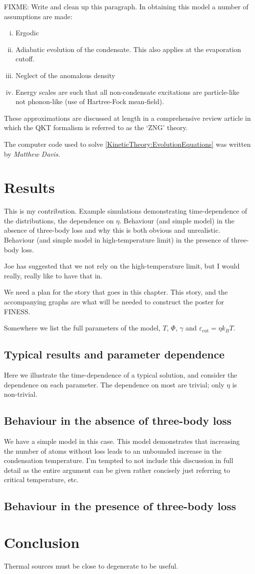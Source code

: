 FIXME: Write and clean up this paragraph. In obtaining this model a number of assumptions are made:
\begin{enumerate}[(i)]
    \item Ergodic
    \item Adiabatic evolution of the condensate. This also applies at the evaporation cutoff.
    \item Neglect of the anomalous density
    \item Energy scales are such that all non-condensate excitations are particle-like not phonon-like (use of Hartree-Fock mean-field).
\end{enumerate}
These approximations are discussed at length in a comprehensive review article \citep{Proukakis:2008} in which the QKT formalism is referred to as the `ZNG' theory.

The computer code used to solve \eqref{KineticTheory:EvolutionEquations} was written by \emph{Matthew Davis}.

\section{Results}
\label{KineticTheory:Results}
This is my contribution. Example simulations demonstrating time-dependence of the distributions, the dependence on $\eta$. Behaviour (and simple model) in the absence of three-body loss and why this is both obvious and unrealistic. Behaviour (and simple model in high-temperature limit) in the presence of three-body loss.

Joe has suggested that we not rely on the high-temperature limit, but I would really, really like to have that in.

We need a plan for the story that goes in this chapter. This story, and the accompanying graphs are what will be needed to construct the poster for FINESS.

Somewhere we list the full parameters of the model, $T$, $\Phi$, $\gamma$ and $\varepsilon_\text{cut} = \eta k_B T$.

\subsection{Typical results and parameter dependence}
Here we illustrate the time-dependence of a typical solution, and consider the dependence on each parameter. The dependence on most are trivial; only $\eta$ is non-trivial.


\subsection{Behaviour in the absence of three-body loss}
We have a simple model in this case. This model demonstrates that increasing the number of atoms without loss leads to an unbounded increase in the condensation temperature. I'm tempted to not include this discussion in full detail as the entire argument can be given rather concisely just referring to critical temperature, etc.


\subsection{Behaviour in the presence of three-body loss}

\section{Conclusion}
Thermal sources must be close to degenerate to be useful. 